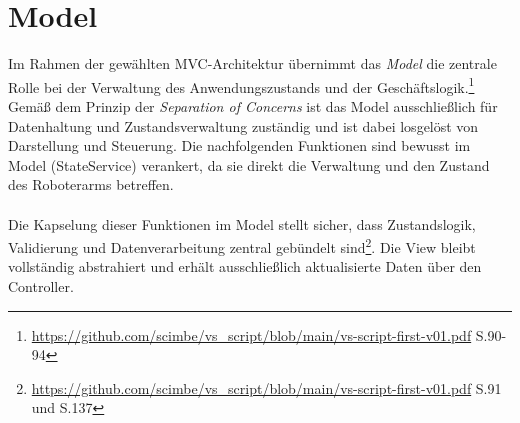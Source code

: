 \section{Model}
Im Rahmen der gewählten MVC-Architektur übernimmt das \textit{Model} die zentrale Rolle bei der Verwaltung des Anwendungszustands und der Geschäftslogik.\footnote{\url{https://github.com/scimbe/vs_script/blob/main/vs-script-first-v01.pdf} S.90-94}
Gemäß dem Prinzip der \textit{Separation of Concerns} ist das Model ausschließlich für Datenhaltung und Zustandsverwaltung zuständig und ist dabei losgelöst von Darstellung und Steuerung. 
Die nachfolgenden Funktionen sind bewusst im Model (StateService) verankert, da sie direkt die Verwaltung und den Zustand des Roboterarms betreffen.
\\\\%
Die Kapselung dieser Funktionen im Model stellt sicher, dass Zustandslogik, Validierung und Datenverarbeitung zentral gebündelt sind\footnote{\url{https://github.com/scimbe/vs_script/blob/main/vs-script-first-v01.pdf} S.91 und S.137}.
Die View bleibt vollständig abstrahiert und erhält ausschließlich aktualisierte Daten über den Controller. 

